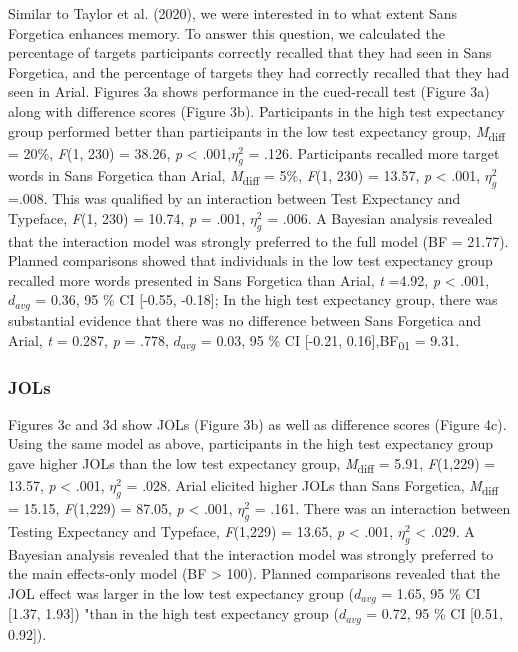 \documentclass[
  english,
  jou]{apa7}
\begin{document}
Similar to Taylor et al. (2020), we were interested in to what extent Sans Forgetica enhances memory. To answer this question, we calculated the percentage of targets participants correctly recalled that they had seen in Sans Forgetica, and the percentage of targets they had correctly recalled that they had seen in Arial. Figures 3a shows performance in the cued-recall test (Figure 3a) along with difference scores (Figure 3b). Participants in the high test expectancy group performed better than participants in the low test expectancy group, \emph{M}\textsubscript{diff} = 20\%, \emph{F}(1, 230) = 38.26, \emph{p} \textless{} .001,\(\eta_{g}^{2}\) = .126. Participants recalled more target words in Sans Forgetica than Arial, \emph{M}\textsubscript{diff} = 5\%, \emph{F}(1, 230) = 13.57, \emph{p} \textless{} .001, \(\eta_{g}^{2}\) =.008. This was qualified by an interaction between Test Expectancy and Typeface, \emph{F}(1, 230) = 10.74, \emph{p} = .001, \(\eta_{g}^{2}\) = .006. A Bayesian analysis revealed that the interaction model was strongly preferred to the full model (BF = 21.77). Planned comparisons showed that individuals in the low test expectancy group recalled more words presented in Sans Forgetica than Arial, \emph{t} =4.92, \emph{p} \textless{} .001, \(d_{avg}\) = 0.36, 95 \% CI {[}-0.55, -0.18{]}; In the high test expectancy group, there was substantial evidence that there was no difference between Sans Forgetica and Arial, \emph{t} = 0.287, \emph{p} = .778, \(d_{avg}\) = 0.03, 95 \% CI {[}-0.21, 0.16{]},BF\textsubscript{01} = 9.31.

\hypertarget{jols-1}{%
\subsubsection{JOLs}\label{jols-1}}

Figures 3c and 3d show JOLs (Figure 3b) as well as difference scores (Figure 4c). Using the same model as above, participants in the high test expectancy group gave higher JOLs than the low test expectancy group, \emph{M}\textsubscript{diff} = 5.91, \emph{F}(1,229) = 13.57, \emph{p} \textless{} .001, \(\eta_{g}^{2}\) = .028. Arial elicited higher JOLs than Sans Forgetica, \emph{M}\textsubscript{diff} = 15.15, \emph{F}(1,229) = 87.05, \emph{p} \textless{} .001, \(\eta_{g}^{2}\) = .161. There was an interaction between Testing Expectancy and Typeface, \emph{F}(1,229) = 13.65, \emph{p} \textless{} .001, \(\eta_{g}^{2}\) \textless{} .029. A Bayesian analysis revealed that the interaction model was strongly preferred to the main effects-only model (BF \textgreater{} 100). Planned comparisons revealed that the JOL effect was larger in the low test expectancy group (\(d_{avg}\) = 1.65, 95 \% CI {[}1.37, 1.93{]}) "than in the high test expectancy group (\(d_{avg}\) = 0.72, 95 \% CI {[}0.51, 0.92{]}).
\end{document}
